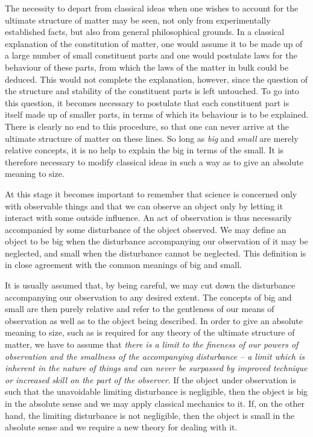 The necessity to depart from classical ideas when one wishes to account for the ultimate structure of matter may be seen, not only from experimentally established facts, but also from general philosophical grounds.  In a classical explanation of the constitution of matter, one would assume it to be made up of a large number of small constituent parts and one would postulate laws for the behaviour of these parts, from which the laws of the matter in bulk could be deduced.  This would not complete the explanation, however, since the question of the structure and stability of the constituent parts is left untouched.  To go into this question, it becomes necessary to postulate that each constituent part is itself made up of smaller parts, in terms of which its behaviour is to be explained.  There is clearly no end to this procedure, so that one can never arrive at the ultimate structure of matter on these lines.  So long as \emph{big} and \emph{small} are merely relative concepts, it is no help to explain the big in terms of the small.  It is therefore necessary to modify classical ideas in such a way as to give an absolute meaning to size.

At this stage it becomes important to remember that science is concerned only with observable things and that we can observe an object only by letting it interact with some outside influence.  An act of observation is thus necessarily accompanied by some disturbance of the object observed.  We may define an object to be big when the disturbance accompanying our observation of it may be neglected, and small when the disturbance cannot be neglected.  This definition is in close agreement with the common meanings of big and small.

It is usually assumed that, by being careful, we may cut down the disturbance accompanying our observation to any desired extent.  The concepts of big and small are then purely relative and refer to the gentleness of our means of observation as well as to the object being described.  In order to give an absolute meaning to size, such as is required for any theory of the ultimate structure of matter, we have to assume that \emph{there is a limit to the fineness of our powers of observation and the smallness of the accompanying disturbance -- a limit which is inherent in the nature of things and can never be surpassed by improved technique or increased skill on the part of the observer}.  If the object under observation is such that the unavoidable limiting disturbance is negligible, then the object is big in the absolute sense and we may apply classical mechanics to it.  If, on the other hand, the limiting disturbance is not negligible, then the object is small in the absolute sense and we require a new theory for dealing with it.

